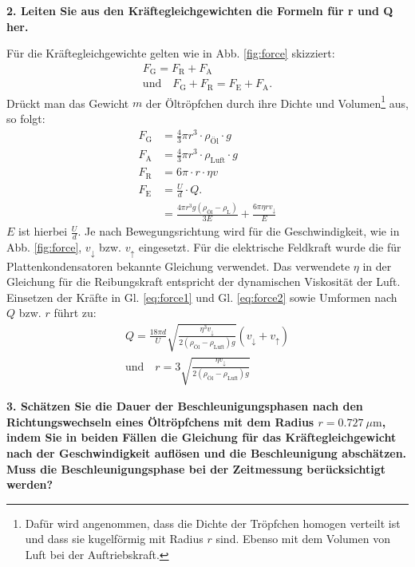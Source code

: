 \vspace{0,5cm}
\noindent \textbf{2. Leiten Sie aus den Kräftegleichgewichten die Formeln für r und Q her.}

	Für die Kräftegleichgewichte gelten wie in Abb. \ref{fig:force} skizziert:
	\begin{align}
		\label{eq:force1}
		F_\text{G} = F_\text{R} + F_\text{A} \\
		\label{eq:force2}
		\text{und} \quad F_\text{G} + F_\text{R} = F_\text{E} + F_\text{A}.
	\end{align}
	Drückt man das Gewicht $m$ der Öltröpfchen durch ihre Dichte und Volumen\footnote{Dafür wird angenommen, dass die Dichte der Tröpfchen homogen verteilt ist und dass sie kugelförmig mit Radius $r$ sind. Ebenso mit dem Volumen von Luft bei der Auftriebskraft.} aus, so folgt:
	\begin{align}
		F_\text{G} &= \frac{4}{3}\pi r^3 \cdot \rho_\text{Öl} \cdot g\\
		F_\text{A} &= \frac{4}{3}\pi r^3 \cdot \rho_\text{Luft} \cdot g\\
		F_\text{R} &= 6\pi \cdot r \cdot \eta v\\
		F_\text{E} &= \frac{U}{d} \cdot Q. \label{eq:eForce} \\
				   &= \frac{4\pi r^3g(\rho_\text{Öl}-\rho_\text{L})}{3E}+ \frac{6\pi \eta r v_\downarrow}{E} 
	\end{align}
	$E$ ist hierbei $\frac{U}{d}$. 
	Je nach Bewegungsrichtung wird für die Geschwindigkeit, wie in Abb. \ref{fig:force}, $v_{\downarrow}$ bzw. $v_{\uparrow}$ eingesetzt. 
	Für die elektrische Feldkraft wurde die für Plattenkondensatoren bekannte Gleichung verwendet. Das verwendete $\eta$ in der Gleichung für die Reibungskraft entspricht der dynamischen Viskosität der Luft.
	Einsetzen der Kräfte in Gl. \ref{eq:force1} und Gl. \ref{eq:force2} sowie Umformen nach $Q$ bzw. $r$ führt zu:
	\begin{align}
		\label{eq:Ladung}
		Q = \frac{18\pi d}{U} \sqrt{\frac{\eta^3 v_\downarrow}{2(\rho_\text{Öl}-\rho_\text{Luft})g}}(v_\downarrow + v_\uparrow) \\
		\text{und} \quad r = 3 \sqrt{\frac{\eta v_\downarrow}{2(\rho_\text{Öl}-\rho_\text{Luft})g}}
	\end{align}
	
\vspace{0,5cm}
\noindent \textbf{3. Schätzen Sie die Dauer der Beschleunigungsphasen nach den Richtungswechseln eines Öltröpfchens mit dem Radius $r = \SI{0,727}{\mu\m}$, indem Sie in beiden Fällen die Gleichung für das Kräftegleichgewicht nach der Geschwindigkeit auflösen und die Beschleunigung abschätzen. Muss die Beschleunigungsphase bei der Zeitmessung berücksichtigt werden?}

